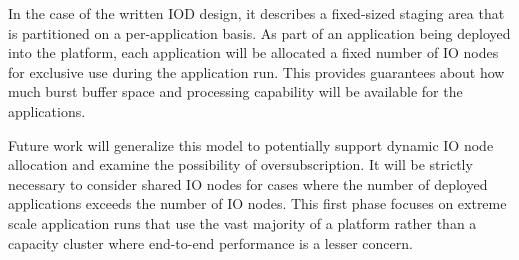 \documentclass[conference]{IEEEtran}
\begin{document}
In the case of the written IOD design, it describes a fixed-sized staging area
that is partitioned on a per-application basis. As part of an application
being deployed into the platform, each application will be allocated a fixed
number of IO nodes for exclusive use during the application run. This provides
guarantees about how much burst buffer space and processing capability will be
available for the applications.


Future work will generalize this model to potentially support dynamic IO node
allocation and examine the possibility of oversubscription. It will be strictly
necessary to consider shared IO nodes for cases where the number of deployed
applications exceeds the number of IO nodes.  This first phase focuses on
extreme scale application runs that use the vast majority of a platform rather
than a capacity cluster where end-to-end performance is a lesser concern.

%
\end{document}
